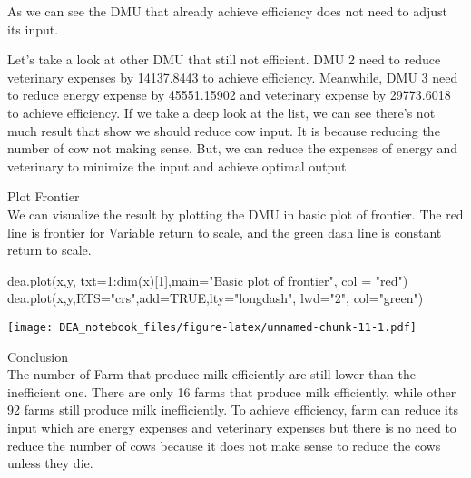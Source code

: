 \documentclass[
]{article}
\newenvironment{Shaded}{\begin{snugshade}}{\end{snugshade}}
\newcommand{\AttributeTok}[1]{\textcolor[rgb]{0.77,0.63,0.00}{#1}}
\newcommand{\ConstantTok}[1]{\textcolor[rgb]{0.00,0.00,0.00}{#1}}
\newcommand{\DecValTok}[1]{\textcolor[rgb]{0.00,0.00,0.81}{#1}}
\newcommand{\FunctionTok}[1]{\textcolor[rgb]{0.00,0.00,0.00}{#1}}
\newcommand{\NormalTok}[1]{#1}
\newcommand{\SpecialCharTok}[1]{\textcolor[rgb]{0.00,0.00,0.00}{#1}}
\newcommand{\StringTok}[1]{\textcolor[rgb]{0.31,0.60,0.02}{#1}}
\begin{document}
As we can see the DMU that already achieve efficiency does not need to
adjust its input.

Let's take a look at other DMU that still not efficient. DMU 2 need to
reduce veterinary expenses by 14137.8443 to achieve efficiency.
Meanwhile, DMU 3 need to reduce energy expense by 45551.15902 and
veterinary expense by 29773.6018 to achieve efficiency. If we take a
deep look at the list, we can see there's not much result that show we
should reduce cow input. It is because reducing the number of cow not
making sense. But, we can reduce the expenses of energy and veterinary
to minimize the input and achieve optimal output.

Plot Frontier\\
We can visualize the result by plotting the DMU in basic plot of
frontier. The red line is frontier for Variable return to scale, and the
green dash line is constant return to scale.

\begin{Shaded}
\begin{Highlighting}[]
\FunctionTok{dea.plot}\NormalTok{(x,y, }\AttributeTok{txt=}\DecValTok{1}\SpecialCharTok{:}\FunctionTok{dim}\NormalTok{(x)[}\DecValTok{1}\NormalTok{],}\AttributeTok{main=}\StringTok{"Basic plot of frontier"}\NormalTok{, }\AttributeTok{col =} \StringTok{"red"}\NormalTok{)}
\FunctionTok{dea.plot}\NormalTok{(x,y,}\AttributeTok{RTS=}\StringTok{"crs"}\NormalTok{,}\AttributeTok{add=}\ConstantTok{TRUE}\NormalTok{,}\AttributeTok{lty=}\StringTok{"longdash"}\NormalTok{, }\AttributeTok{lwd=}\StringTok{"2"}\NormalTok{, }\AttributeTok{col=}\StringTok{"green"}\NormalTok{)}
\end{Highlighting}
\end{Shaded}

\texttt{[image: DEA\_notebook\_files/figure-latex/unnamed-chunk-11-1.pdf]}

Conclusion\\
The number of Farm that produce milk efficiently are still lower than
the inefficient one. There are only 16 farms that produce milk
efficiently, while other 92 farms still produce milk inefficiently. To
achieve efficiency, farm can reduce its input which are energy expenses
and veterinary expenses but there is no need to reduce the number of
cows because it does not make sense to reduce the cows unless they die.
\end{document}
